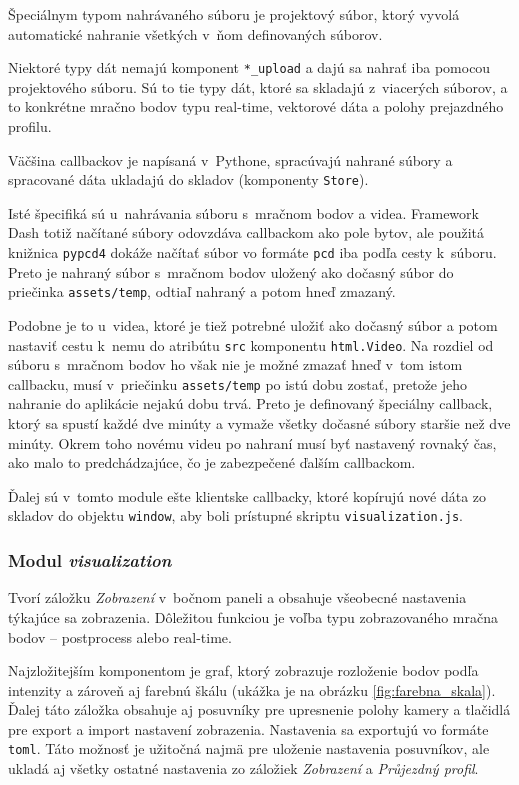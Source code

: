 Špeciálnym typom nahrávaného súboru je projektový súbor, ktorý vyvolá automatické nahranie všetkých v~ňom definovaných súborov.

Niektoré typy dát nemajú komponent \texttt{*\_upload} a dajú sa nahrať iba pomocou projektového súboru. Sú to tie typy dát, ktoré sa skladajú z~viacerých súborov, a to konkrétne mračno bodov typu real-time, vektorové dáta a polohy prejazdného profilu.

Väčšina callbackov je napísaná v~Pythone, spracúvajú nahrané súbory a spracované dáta ukladajú do skladov (komponenty \texttt{Store}).

Isté špecifiká sú u~nahrávania súboru s~mračnom bodov a videa. Framework Dash totiž načítané súbory odovzdáva callbackom ako pole bytov, ale použitá knižnica \texttt{pypcd4} dokáže načítať súbor vo formáte \texttt{pcd} iba podľa cesty k~súboru. Preto je nahraný súbor s~mračnom bodov uložený ako dočasný súbor do priečinka \texttt{assets/temp}, odtiaľ nahraný a potom hneď zmazaný.

Podobne je to u~videa, ktoré je tiež potrebné uložiť ako dočasný súbor a potom nastaviť cestu k~nemu do atribútu \texttt{src} komponentu \texttt{html.Video}. Na rozdiel od súboru s~mračnom bodov ho však nie je možné zmazať hneď v~tom istom callbacku, musí v~priečinku \texttt{assets/temp} po istú dobu zostať, pretože jeho nahranie do aplikácie nejakú dobu trvá. Preto je definovaný špeciálny callback, ktorý sa spustí každé dve minúty a vymaže všetky dočasné súbory staršie než dve minúty. Okrem toho novému videu po nahraní musí byť nastavený rovnaký čas, ako malo to predchádzajúce, čo je zabezpečené ďalším callbackom.

Ďalej sú v~tomto module ešte klientske callbacky, ktoré kopírujú nové dáta zo skladov do objektu \texttt{window}, aby boli prístupné skriptu \texttt{visualization.js}.

\subsubsection{Modul \emph{visualization} }

Tvorí záložku \emph{Zobrazení} v~bočnom paneli a obsahuje všeobecné nastavenia týkajúce sa zobrazenia. Dôležitou funkciou je voľba typu zobrazovaného mračna bodov -- postprocess alebo real-time.

Najzložitejším komponentom je graf, ktorý zobrazuje rozloženie bodov podľa intenzity a zároveň aj farebnú škálu (ukážka je na obrázku \ref{fig:farebna_skala}). Ďalej táto záložka obsahuje aj posuvníky pre upresnenie polohy kamery a tlačidlá pre export a import nastavení zobrazenia. Nastavenia sa exportujú vo formáte \texttt{toml}. Táto možnosť je užitočná najmä pre uloženie nastavenia posuvníkov, ale ukladá aj všetky ostatné nastavenia zo záložiek \emph{Zobrazení} a \emph{Průjezdný profil}.

